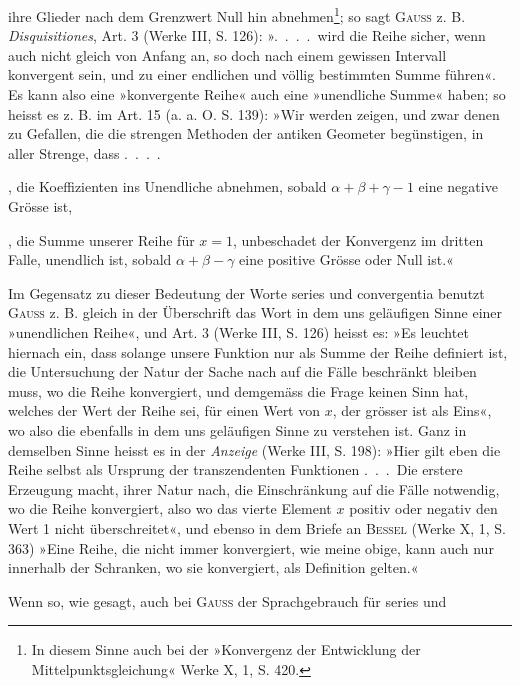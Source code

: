 \clearpage{}
\noindent ihre Glieder nach dem Grenzwert Null hin abnehmen\footnote{In diesem Sinne auch bei der »Konvergenz der Entwicklung der Mittelpunktsgleichung« Werke X, 1, S. 420.}; so sagt \textsc{Gauss} z. B.
\textit{Disquisitiones}, Art. 3 (Werke III, S. 126): »\mbox{.\ .\ .\ .}\ wird die Reihe sicher, wenn
auch nicht gleich von Anfang an, so doch nach einem gewissen Intervall konvergent
sein, und zu einer endlichen und völlig bestimmten Summe führen«.
Es kann also eine »konvergente Reihe« auch eine »unendliche Summe« haben;
so heisst es z. B. im Art. 15 (a. a. O. S. 139): »Wir werden zeigen, und zwar
denen zu Gefallen, die die strengen Methoden der antiken Geometer begünstigen,
in aller Strenge, dass \mbox{.\ .\ .\ .}
\par
{}, die Koeffizienten ins Unendliche abnehmen, sobald \(\alpha+\beta+\gamma-1\)
eine negative Grösse ist,
\par
{}, die Summe unserer Reihe für \(x=1\), unbeschadet der Konvergenz
im dritten Falle, unendlich ist, sobald \(\alpha+\beta-\gamma\) eine positive Grösse oder
Null ist.«
\par
Im Gegensatz zu dieser Bedeutung der Worte series und convergentia
benutzt \textsc{Gauss} z. B. gleich in der Überschrift das Wort  in
dem uns geläufigen Sinne einer »unendlichen Reihe«, und Art. 3 (Werke III,
S. 126) heisst es: »Es leuchtet hiernach ein, dass solange unsere Funktion nur
als Summe der Reihe definiert ist, die Untersuchung der Natur der Sache nach
auf die Fälle beschränkt bleiben muss, wo die Reihe konvergiert, und demgemäss
die Frage keinen Sinn hat, welches der Wert der Reihe sei, für einen
Wert von \(x\), der grösser ist als Eins«, wo also die  ebenfalls
in dem uns geläufigen Sinne zu verstehen ist. Ganz in demselben Sinne heisst
es in der \textit{Anzeige} (Werke III, S. 198): »Hier gilt eben die Reihe selbst als
Ursprung der transzendenten Funktionen \mbox{.\ .\ .}\ Die erstere Erzeugung macht,
ihrer Natur nach, die Einschränkung auf die Fälle notwendig, wo die Reihe
konvergiert, also wo das vierte Element \(x\) positiv oder negativ den Wert 1
nicht überschreitet«, und ebenso in dem Briefe an \textsc{Bessel} (Werke X, 1, S. 363)
»Eine Reihe, die nicht immer konvergiert, wie meine obige, kann auch nur
innerhalb der Schranken, wo sie konvergiert, als Definition gelten.«
\par
Wenn so, wie gesagt, auch bei \textsc{Gauss} der Sprachgebrauch für series und
